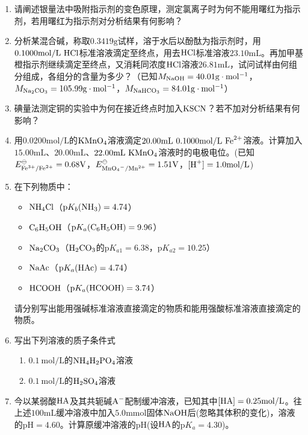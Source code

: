 \begin{enumerate}[label=\arabic*., itemsep=1.5ex]
    \item 请阐述银量法中吸附指示剂的变色原理，测定氯离子时为何不能用曙红为指示剂，若用曙红为指示剂对分析结果有何影响？
    \item 分析某混合碱，称取$0.3419\mathrm{g}$试样，溶于水后以酚酞为指示剂时，用$0.1000\mathrm{mol/L}\ \ce{HCl}$标准溶液滴定至终点，用去$\ce{HCl}$标准溶液$23.10\mathrm{mL}$。再加甲基橙指示剂继续滴定至终点，又消耗同浓度$\ce{HCl}$溶液$26.81\mathrm{mL}$，试问试样由何组分组成，各组分的含量为多少？（已知$M_{\ce{NaOH}}=40.01\mathrm{g\cdot mol^{-1}}$，$M_{\ce{Na2CO3}}=105.99\mathrm{g\cdot mol^{-1}}$，$M_{\ce{NaHCO3}}=84.01\mathrm{g\cdot mol^{-1}}$）
    \item 碘量法测定铜的实验中为何在接近终点时加入$\ce{KSCN}$？若不加对分析结果有何影响？
    \item 用$0.0200\mathrm{mol/L}$的$\ce{KMnO4}$溶液滴定$20.00\mathrm{mL}\ 0.1000\mathrm{mol/L}\ \ce{Fe^{2+}}$溶液。计算加入$15.00\mathrm{mL}$、$20.00\mathrm{mL}$、$22.00\mathrm{mL}\ \ce{KMnO4}$溶液时的电极电位。(已知$E^\ominus_{\ce{Fe^{3+}/Fe^{2+}}}=0.68\mathrm{V}$，$E^\ominus_{\ce{MnO4^-/Mn^{2+}}}=1.51\mathrm{V}$，$[\ce{H^+}]=1.0\mathrm{mol/L}$)
    \item 在下列物质中：
    \begin{itemize}
        \item $\ce{NH4Cl}$（$\mathrm{p}K_b(\ce{NH3})=4.74$）
        \item $\ce{C6H5OH}$（$\mathrm{p}K_a(\ce{C6H5OH})=9.96$）
        \item $\ce{Na2CO3}$（$\ce{H2CO3}$的$\mathrm{p}K_{a1}=6.38$，$\mathrm{p}K_{a2}=10.25$）
        \item $\ce{NaAc}$（$\mathrm{p}K_a(\ce{HAc})=4.74$）
        \item $\ce{HCOOH}$（$\mathrm{p}K_a(\ce{HCOOH})=3.74$）
    \end{itemize}
    请分别写出能用强碱标准溶液直接滴定的物质和能用强酸标准溶液直接滴定的物质。
    \item 写出下列溶液的质子条件式
    \begin{enumerate}[label=(\arabic*), noitemsep, topsep=0pt, partopsep=0pt]
        \item $0.1\ \mathrm{mol/L}$的$\ce{NH4H2PO4}$溶液
        \item $0.1\ \mathrm{mol/L}$的$\ce{H2SO4}$溶液
    \end{enumerate}
    \item 今以某弱酸$\ce{HA}$及其共轭碱$\ce{A^-}$配制缓冲溶液，已知其中$[\ce{HA}]=0.25\mathrm{mol/L}$。往上述$100\mathrm{mL}$缓冲溶液中加入$5.0\mathrm{mmol}$固体$\ce{NaOH}$后(忽略其体积的变化)，溶液的$\mathrm{pH}=4.60$。计算原缓冲溶液的$\mathrm{pH}$(设$\ce{HA}$的$\mathrm{p}K_a=4.30$)。
\end{enumerate}

